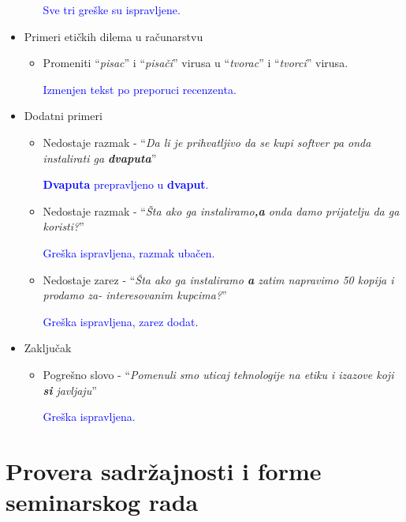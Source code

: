 \documentclass[a4paper]{report}
\newcommand{\odgovor}[1]{\textcolor{blue}{#1}}
\begin{document}
\begin{itemize}
\begin{itemize}
        \odgovor{Sve tri greške su ispravljene.}
        
    \end{itemize}
    \item Primeri etičkih dilema u računarstvu
    \begin{itemize}
        \item Promeniti ``\textit{pisac}'' i ``\textit{pisači}'' virusa u ``\textit{tvorac}'' i ``\textit{tvorci}'' virusa.
        
        \odgovor{Izmenjen tekst po preporuci recenzenta.}

    \end{itemize}
    \item Dodatni primeri
    \begin{itemize}
        \item Nedostaje razmak - ``\textit{Da li je prihvatljivo da se kupi softver pa onda instalirati ga \textbf{dvaputa}}''
        
        \odgovor{\textbf{Dvaputa} prepravljeno u \textbf{dvaput}.}

        \item Nedostaje razmak - ``\textit{Šta ako ga instaliramo\textbf{,a} onda damo prijatelju da ga koristi?}''
        
        \odgovor{Greška ispravljena, razmak ubačen.}

        \item Nedostaje zarez - ``\textit{Šta ako ga instaliramo\textbf{ a} zatim napravimo 50 kopija i prodamo za-
interesovanim kupcima?}''

		\odgovor{Greška ispravljena, zarez dodat.}

    \end{itemize}
    \item Zaključak
    \begin{itemize}
        \item Pogrešno slovo - ``\textit{Pomenuli smo uticaj tehnologije na etiku i izazove koji \textbf{si} javljaju}''

        \odgovor{Greška ispravljena.}

    \end{itemize}
\end{itemize}

\section{Provera sadržajnosti i forme seminarskog rada}
\end{document}
